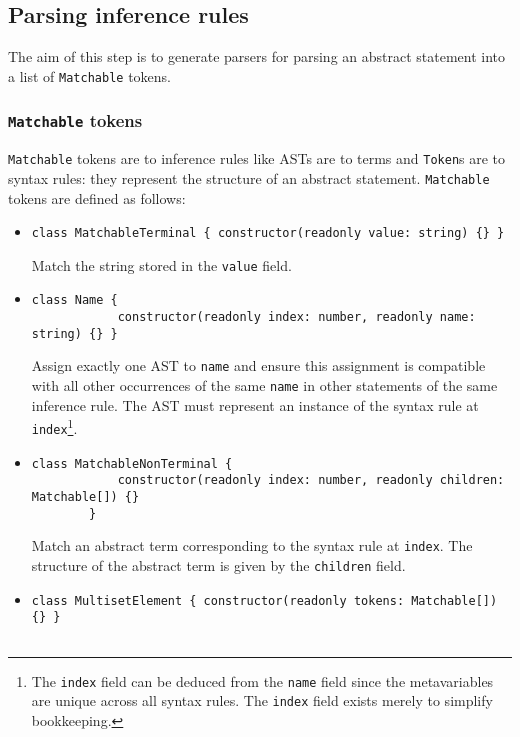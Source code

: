 \subsection{Parsing inference rules}
\label{inference:parsing}
The aim of this step is to generate parsers for parsing an abstract statement into a list of \lstinline{Matchable} tokens.

\subsubsection{\texorpdfstring{\lstinline{Matchable}}{Matchable} tokens}
\lstinline{Matchable} tokens are to inference rules like ASTs are to terms and \lstinline{Token}s are to syntax rules: they represent the structure of an abstract statement. \lstinline{Matchable} tokens are defined as follows:
\begin{itemize}
    \item \begin{lstlisting}[style=ds]
        class MatchableTerminal { constructor(readonly value: string) {} }
    \end{lstlisting}
    Match the string stored in the \lstinline{value} field.
    \item \begin{lstlisting}[style=ds]
        class Name {
            constructor(readonly index: number, readonly name: string) {} }
    \end{lstlisting}
    Assign exactly one AST to \lstinline{name} and ensure this assignment is compatible with all other occurrences of the same \lstinline{name} in other statements of the same inference rule. The AST must represent an instance of the syntax rule at \lstinline{index}\footnote{The \lstinline{index} field can be deduced from the \lstinline{name} field since the metavariables are unique across all syntax rules. The \lstinline{index} field exists merely to simplify bookkeeping.}.
    \item \begin{lstlisting}[style=ds]
        class MatchableNonTerminal {
            constructor(readonly index: number, readonly children: Matchable[]) {}
        }
    \end{lstlisting}
    Match an abstract term corresponding to the syntax rule at \lstinline{index}. The structure of the abstract term is given by the \lstinline{children} field.
    \item \begin{lstlisting}[style=ds]
        class MultisetElement { constructor(readonly tokens: Matchable[]) {} }


\end{lstlisting}
\end{itemize}
